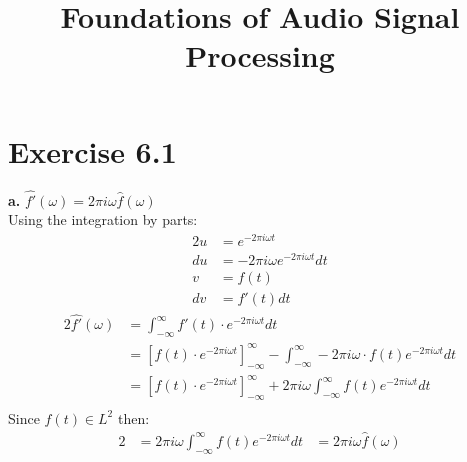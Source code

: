 \documentclass[12pt]{article}
\title{Foundations of Audio Signal Processing\\ \ass}
\author{\auth}
\begin{document}
	\maketitle
	\section*{Exercise 6.1}
	\textbf{a.} $\hat{f'}(\omega) = 2 \pi i \omega \hat{f}(\omega)$\\
	Using the integration by parts:
	\begin{alignat*}{2}
		u &= e^{-2\pi i \omega t}\\
		du &= -2\pi i \omega e^{-2\pi i \omega t} dt\\
		v &= f(t)\\
		dv &= f'(t) dt
	\end{alignat*}
	\begin{alignat*}{2}
		\hat{f'}(\omega) &= \int_{-\infty}^{\infty} f'(t) \cdot e^{-2\pi i \omega t} dt\\
		&= \left[f(t) \cdot e^{-2\pi i \omega t}\right]_{-\infty}^{\infty} - \int_{-\infty}^{\infty} -2\pi i \omega \cdot f(t) e^{-2\pi i \omega t} dt\\
		&= \left[f(t) \cdot e^{-2\pi i \omega t}\right]_{-\infty}^{\infty} + 2\pi i \omega  \int_{-\infty}^{\infty}  f(t) e^{-2\pi i \omega t} dt\\
	\end{alignat*}
	Since $f(t) \in L^2$ then:
	\begin{alignat*}{2}
	&= 2\pi i \omega \int_{-\infty}^{\infty} f(t) e^{-2\pi i \omega t} dt &= 2\pi i \omega \hat{f}(\omega)
	\end{alignat*}
	
\end{document}
